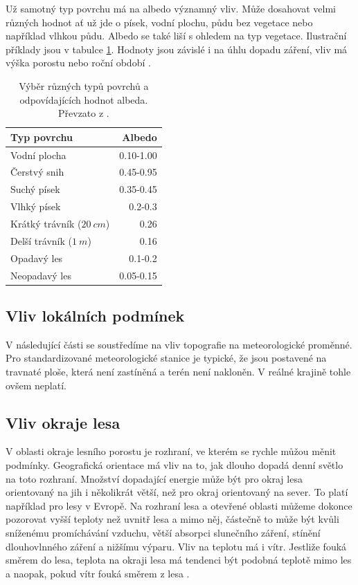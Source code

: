 Už samotný typ povrchu má na albedo významný vliv. Může dosahovat velmi různých hodnot ať už jde o písek, vodní plochu, půdu bez vegetace nebo například vlhkou půdu. Albedo se také liší s ohledem na typ vegetace. Ilustrační příklady jsou v tabulce \ref{tab:albedo}. Hodnoty jsou závislé i na úhlu dopadu záření, vliv má výška porostu nebo roční období \parencite{arya2001,alma}.

\begin{table}
\centering\footnotesize\sf
\begin{tabular}{lr}
\toprule
Typ povrchu & Albedo \\
\midrule
Vodní plocha & 0.10-1.00 \\
Čerstvý snih & 0.45-0.95 \\
Suchý písek & 0.35-0.45\\
Vlhký písek & 0.2-0.3\\
Krátký trávník ($\SI{20}{cm}$) & 0.26\\
Delší trávník ($\SI{1}{m}$) & 0.16\\
Opadavý les & 0.1-0.2\\
Neopadavý les & 0.05-0.15\\
\bottomrule
\end{tabular}
	\caption{Výběr různých typů povrchů a odpovídajících hodnot albeda. Převzato z \parencite{arya2001}.}
\label{tab:albedo}
\end{table}

\subsection{Vliv lokálních podmínek} \label{chap:topo}
V následující části se soustředíme na vliv topografie na meteorologické proměnné. Pro standardizované meteorologické stanice je typické, že jsou postavené na travnaté ploše, která není zastíněná a terén není nakloněn. V reálné krajině tohle ovšem neplatí.

\subsection{Vliv okraje lesa}
V oblasti okraje lesního porostu je rozhraní, ve kterém se rychle můžou měnit podmínky. Geografická orientace má vliv na to, jak dlouho dopadá denní světlo na toto rozhraní. Množství dopadající energie může být pro okraj lesa orientovaný na jih i několikrát větší, než pro okraj orientovaný na sever. To platí například pro lesy v Evropě. Na rozhraní lesa a otevřené oblasti můžeme dokonce pozorovat vyšší teploty než uvnitř lesa a mimo něj, částečně to může být kvůli sníženému promíchávání vzduchu, větší absorpci slunečního záření, stínění dlouhovlnného záření a nižšímu výparu. Vliv na teplotu má i vítr. Jestliže fouká směrem do lesa, teplota na okraji lesa má tendenci být podobná teplotě mimo les a naopak, pokud vítr fouká směrem z lesa \parencite{alma}.

